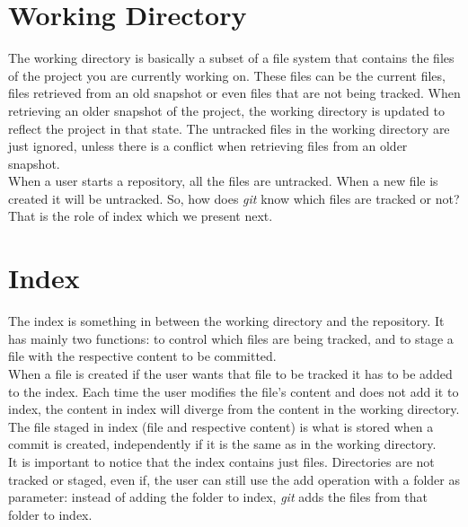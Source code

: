 \section{Working Directory}

The working directory is basically a subset of
a file system that contains the files of the project you are
currently working on. These files can be the current files, files
retrieved from an old snapshot or even files that are not being
tracked. When retrieving an older snapshot of the project, the
working directory is updated to reflect the project in that state. The
untracked files in the working directory are just ignored, unless
there is a conflict when retrieving files from an older snapshot.\\

When a user starts a repository, all the files are untracked. When a
new file is created it will be untracked. So, how does \emph{git} know which
files are tracked or not? That is the role of index which we present
next.

\section{Index}
The index is something in between the working directory and the
repository. It has mainly two functions: to control which files are
being tracked, and to stage a file with the respective content to be
committed.\\

When a file is created if the user wants that file to be
tracked it has to be added to the index. Each time the user modifies
the file's content and does not add it to index, the content in
index will diverge from the content in the working directory. The
file staged in index (file and respective content) is what is stored 
when a commit is created, independently if it is the same as in the
working directory.\\

It is important to notice that the index contains
just files. Directories are not tracked or staged, even if, the user
can still use the add operation with a
folder as parameter: instead of adding the folder to index, \emph{git} adds the files
from that folder to index.


